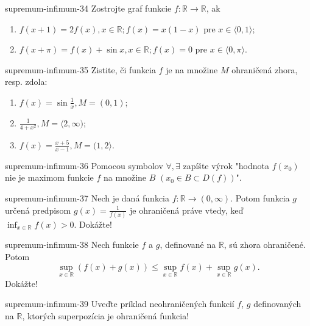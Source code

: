 \begin{defproblem}{supremum-infimum-34}
Zostrojte graf funkcie $f:\mathbb{R}\rightarrow\mathbb{R}$, ak
\begin{enumerate}
\item $f(x+1)=2f(x),x\in\mathbb{R};f(x)=x(1-x)$ pre $x\in\langle 0,1 \rangle$;\\
\item $f(x+\pi)=f(x)+\sin x,x\in\mathbb{R};f(x)=0$ pre $x\in\langle 0,\pi \rangle$.
\end{enumerate}
\end{defproblem}

\begin{defproblem}{supremum-infimum-35}
Zistite, či funkcia $f$ je na množine $M$ ohraničená zhora, resp. zdola:
\begin{enumerate}
\item $f(x)=\sin\frac{1}{x},M=(0,1)$;
\item $\frac{1}{4+x^2},M=\langle 2,\infty )$;
\item $f(x)=\frac{x+5}{x-1},M=(1,2\rangle$.
\end{enumerate}
\end{defproblem}

\begin{defproblem}{supremum-infimum-36}
Pomocou symbolov $\forall,\exists$ zapíšte výrok "hodnota $f(x_0)$ nie je maximom funkcie $f$ na množine $B$ $(x_0\in B\subset D(f))$".
\end{defproblem}

\begin{defproblem}{supremum-infimum-37}
Nech je daná funkcia $f:\mathbb{R}\rightarrow(0,\infty)$. Potom funkcia $g$ určená predpisom $g(x)=\frac{1}{f(x)}$ je ohraničená práve vtedy, keď $\inf_{x\in\mathbb{R}}f(x)>0$. Dokážte!
\end{defproblem}

\begin{defproblem}{supremum-infimum-38}
Nech funkcie $f$ a $g$, definované na $\mathbb{R}$, sú zhora ohraničené. Potom $$\sup_{x\in\mathbb{R}}(f(x)+g(x))\leq\sup_{x\in\mathbb{R}}f(x)+\sup_{x\in\mathbb{R}}g(x).$$ Dokážte!
\end{defproblem}

\begin{defproblem}{supremum-infimum-39}
Uveďte príklad neohraničených funkcií $f$, $g$ definovaných na $\mathbb{R}$, ktorých superpozícia je ohraničená funkcia!
\end{defproblem}

